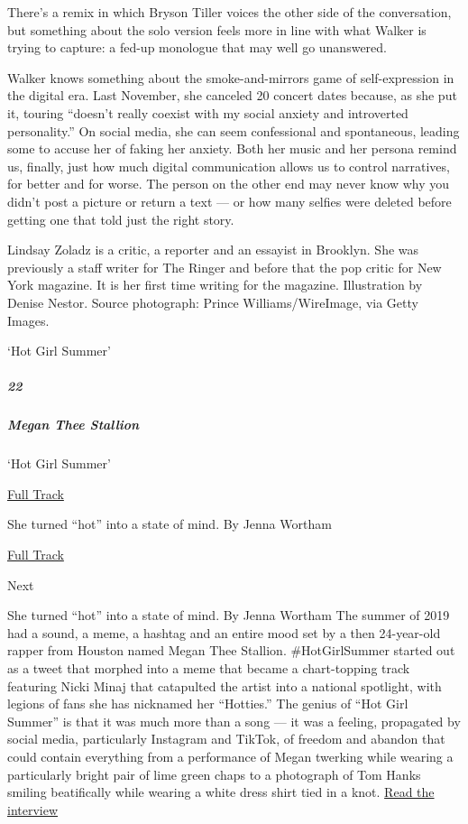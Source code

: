 There's a remix in which Bryson Tiller voices the other side of the
conversation, but something about the solo version feels more in line
with what Walker is trying to capture: a fed-up monologue that may well
go unanswered.

Walker knows something about the smoke-and-mirrors game of
self-expression in the digital era. Last November, she canceled 20
concert dates because, as she put it, touring ``doesn't really coexist
with my social anxiety and introverted personality.'' On social media,
she can seem confessional and spontaneous, leading some to accuse her of
faking her anxiety. Both her music and her persona remind us, finally,
just how much digital communication allows us to control narratives, for
better and for worse. The person on the other end may never know why you
didn't post a picture or return a text --- or how many selfies were
deleted before getting one that told just the right story.

Lindsay Zoladz is a critic, a reporter and an essayist in Brooklyn. She
was previously a staff writer for The Ringer and before that the pop
critic for New York magazine. It is her first time writing for the
magazine. Illustration by Denise Nestor. Source photograph: Prince
Williams/WireImage, via Getty Images.

`Hot Girl Summer'

\hypertarget{22}{%
\subparagraph{22}\label{22}}

\hypertarget{megan-thee-stallion}{%
\subparagraph{Megan Thee Stallion}\label{megan-thee-stallion}}

`Hot Girl Summer'

\href{https://open.spotify.com/track/5N1o6d8zGcSZSeMFkOUQOk}{ Full
Track}

She turned ``hot'' into a state of mind. By Jenna Wortham

\href{https://open.spotify.com/track/5N1o6d8zGcSZSeMFkOUQOk}{Full Track
}

Next

She turned ``hot'' into a state of mind. By Jenna Wortham The summer of
2019 had a sound, a meme, a hashtag and an entire mood set by a then
24-year-old rapper from Houston named Megan Thee Stallion.
\#HotGirlSummer started out as a tweet that morphed into a meme that
became a chart-topping track featuring Nicki Minaj that catapulted the
artist into a national spotlight, with legions of fans she has nicknamed
her ``Hotties.'' The genius of ``Hot Girl Summer'' is that it was much
more than a song --- it was a feeling, propagated by social media,
particularly Instagram and TikTok, of freedom and abandon that could
contain everything from a performance of Megan twerking while wearing a
particularly bright pair of lime green chaps to a photograph of Tom
Hanks smiling beatifically while wearing a white dress shirt tied in a
knot.
\href{https://www.nytimes3xbfgragh.onion/interactive/2020/03/11/magazine/megan-thee-stallion-interview.html}{Read
the interview}

